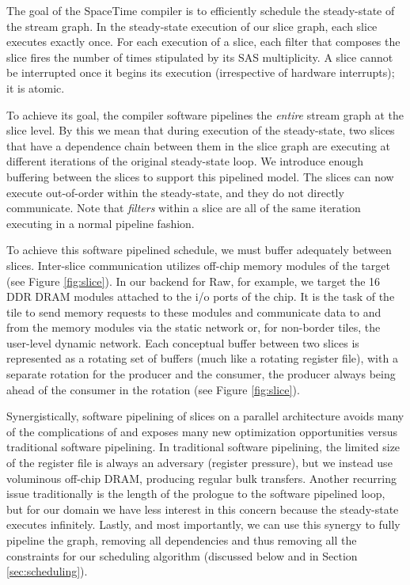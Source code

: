 The goal of the SpaceTime compiler is to efficiently schedule the
steady-state of the stream graph. In the steady-state execution of our
slice graph, each slice executes exactly once. For each execution of a
slice, each filter that composes the slice fires the number of times
stipulated by its SAS multiplicity.  A slice cannot be interrupted
once it begins its execution (irrespective of hardware interrupts); it
is atomic.

To achieve its goal, the compiler software pipelines the {\it entire}
stream graph at the slice level. By this we mean that during execution
of the steady-state, two slices that have a dependence chain between
them in the slice graph are executing at different iterations of the
original steady-state loop.  We introduce enough buffering between the
slices to support this pipelined model. The slices can now execute
out-of-order within the steady-state, and they do not directly
communicate.  Note that {\it filters} within a slice are all of the
same iteration executing in a normal pipeline fashion.

To achieve this software pipelined schedule, we must buffer adequately
between slices.  Inter-slice communication utilizes off-chip memory
modules of the target (see Figure \ref{fig:slice}).  In our backend
for Raw, for example, we target the 16 DDR DRAM modules attached to
the i/o ports of the chip.  It is the task of the tile to send memory
requests to these modules and communicate data to and from the memory
modules via the static network or, for non-border tiles, the
user-level dynamic network.  Each conceptual buffer between two slices
is represented as a rotating set of buffers (much like a rotating
register file), with a separate rotation for the producer and the
consumer, the producer always being ahead of the consumer in the
rotation (see Figure \ref{fig:slice}).

Synergistically, software pipelining of slices on a parallel
architecture avoids many of the complications of and exposes many new
optimization opportunities versus traditional software pipelining.  In
traditional software pipelining, the limited size of the register file
is always an adversary (register pressure), but we instead use
voluminous off-chip DRAM, producing regular bulk transfers.  Another
recurring issue traditionally is the length of the prologue to the
software pipelined loop, but for our domain we have less interest in
this concern because the steady-state executes infinitely.  Lastly,
and most importantly, we can use this synergy to fully pipeline the
graph, removing all dependencies and thus removing all the constraints
for our scheduling algorithm (discussed below and in Section
\ref{sec:scheduling}).

